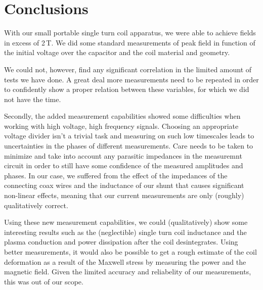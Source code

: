 \section{Conclusions}
With our small portable single turn coil apparatus, we were able to achieve 
fields in excess of 2\,T. We did some standard measurements of peak field 
in function of the initial voltage over the capacitor and the coil material 
and geometry.

We could not, however, find any significant correlation in the limited 
amount of tests we have done. A great deal more measurements need to be 
repeated in order to confidently show a proper relation between these 
variables, for which we did not have the time.

Secondly, the added measurement capabilities showed some difficulties when 
working with high voltage, high frequency signals. Choosing an appropriate 
voltage divider isn't a trivial task and measuring on such low timescales 
leads to uncertainties in the phases of different measurements. Care needs 
to be taken to minimize and take into account any parasitic impedances in 
the measuremnt circuit in order to still have some confidence of the 
measured amplitudes and phases. In our case, we suffered from the effect of 
the impedances of the connecting coax wires and the inductance of our shunt 
that causes significant non-linear effects, meaning that our current 
measurements are only (roughly) qualitatively correct.

Using these new measurement capabilities, we could (qualitatively) show 
some interesting results such as the (neglectible) single turn coil 
inductance and the plasma conduction and power dissipation after the coil 
desintegrates. Using better measurements, it would also be possible to get 
a rough estimate of the coil deformation as a result of the Maxwell stress 
by measuring the power and the magnetic field. Given the limited accuracy 
and reliabelity of our measurements, this was out of our scope.


